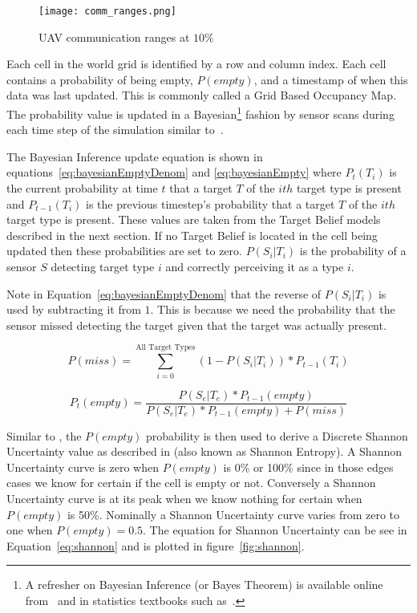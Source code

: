 \begin{figure}[H]
	\centering
	\texttt{[image: comm\_ranges.png]}
	\caption{UAV communication ranges at $10\%$}
	\label{fig:comm_ranges}
\end{figure}

Each cell in the world grid is identified by a row and column index.  Each cell contains a probability of being empty, $P(empty)$, and a timestamp of when this data was last updated.  This is commonly called a Grid Based Occupancy Map. The probability value is updated in a Bayesian\footnote{A refresher on Bayesian Inference (or Bayes Theorem) is available online from~\textcite{bayes_lecture} and in statistics textbooks such as~\textcite{stats_textbook}.} fashion by sensor scans during each time step of the simulation similar to~\textcite{waharte}.  
	
The Bayesian Inference update equation is shown in equations~\ref{eq:bayesianEmptyDenom} and \ref{eq:bayesianEmpty} where $P_{t}(T_{i})$ is the current probability at time $t$ that a target $T$ of the $ith$ target type is present and  $P_{t-1}(T_{i})$ is the previous timestep's probability that a target $T$ of the $ith$ target type is present.  These values are taken from the Target Belief models described in the next section.  If no Target Belief is located in the cell being updated then these probabilities are set to zero.  $P(S_{i}|T_{i})$ is the probability of a sensor $S$ detecting target type $i$ and correctly perceiving it as a type $i$.  

Note in Equation~\ref{eq:bayesianEmptyDenom} that the reverse of $P(S_{i}|T_{i})$ is used by subtracting it from $1$.  This is because we need the probability that the sensor missed detecting the target given that the target was actually present.  

\begin{equation}
\label{eq:bayesianEmptyDenom}
P(miss) = \sum_{i=0}^{\text{All Target Types}} (1 - P(S_{i}|T_{i})) * P_{t-1}(T_{i})
\end{equation}

\begin{equation}
\label{eq:bayesianEmpty}
P_{t}(empty) = \frac{P(S_{e}|T_{e})*P_{t-1}(empty)}{ P(S_{e}|T_{e})*P_{t-1}(empty) + P(miss)}
\end{equation}


Similar to \textcite{jin}, the $P(empty)$ probability is then used to derive a Discrete Shannon Uncertainty value as described in \textcite{shannon} (also known as Shannon Entropy).  A Shannon Uncertainty curve is zero when $P(empty)$ is 0\% or 100\% since in those edges cases we know for certain if the cell is empty or not.  Conversely a Shannon Uncertainty curve is at its peak when we know nothing for certain when $P(empty)$ is 50\%.  Nominally a Shannon Uncertainty curve varies from zero to one when $P(empty) = 0.5$. The equation for Shannon Uncertainty can be see in Equation~\ref{eq:shannon} and is plotted in figure~\ref{fig:shannon}.
	
